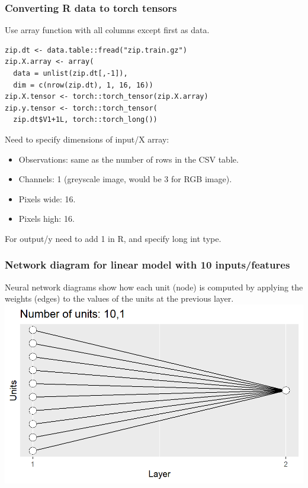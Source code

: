 \documentclass{beamer}
\begin{document}
\begin{frame}[fragile]
  \frametitle{Converting R data to torch tensors}
Use array function with all columns except first as data.  
\begin{verbatim}
zip.dt <- data.table::fread("zip.train.gz")
zip.X.array <- array(
  data = unlist(zip.dt[,-1]),
  dim = c(nrow(zip.dt), 1, 16, 16))
zip.X.tensor <- torch::torch_tensor(zip.X.array)
zip.y.tensor <- torch::torch_tensor(
  zip.dt$V1+1L, torch::torch_long())
\end{verbatim}
Need to specify dimensions of input/X array:
\begin{itemize}
\item Observations: same as the number of rows in the CSV table.
\item Channels: 1 (greyscale image, would be 3 for RGB image).
\item Pixels wide: 16.
\item Pixels high: 16.
\end{itemize}
For output/y need to add 1 in R, and specify long int type.
\end{frame}

\begin{frame}
  \frametitle{Network diagram for linear model with 10 inputs/features}
  Neural network
  diagrams show how each unit (node) is computed by applying the
  weights (edges) to the values of the units at the previous layer.
\includegraphics[width=\textwidth]{figure-architecture-linear}
\end{frame}
\end{document}
